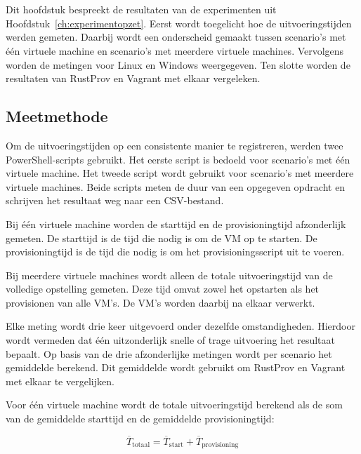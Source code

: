 \chapter{}%
\label{ch:resultaten}

Dit hoofdstuk bespreekt de resultaten van de experimenten uit
Hoofdstuk~\ref{ch:experimentopzet}. Eerst wordt toegelicht hoe de
uitvoeringstijden werden gemeten. Daarbij wordt een onderscheid gemaakt tussen
scenario's met één virtuele machine en scenario's met meerdere virtuele machines.
Vervolgens worden de metingen voor Linux en Windows weergegeven. Ten slotte
worden de resultaten van RustProv en Vagrant met elkaar vergeleken.

\section{Meetmethode}
\label{sec:meetmethode}

Om de uitvoeringstijden op een consistente manier te registreren, werden twee
PowerShell-scripts gebruikt. Het eerste script is bedoeld voor scenario's met
één virtuele machine. Het tweede script wordt gebruikt voor scenario's met
meerdere virtuele machines. Beide scripts meten de duur van een opgegeven
opdracht en schrijven het resultaat weg naar een CSV-bestand.

Bij één virtuele machine worden de starttijd en de provisioningtijd afzonderlijk
gemeten. De starttijd is de tijd die nodig is om de VM op te starten. De
provisioningtijd is de tijd die nodig is om het provisioningsscript uit te
voeren.

Bij meerdere virtuele machines wordt alleen de totale uitvoeringstijd van de
volledige opstelling gemeten. Deze tijd omvat zowel het opstarten als het
provisionen van alle VM's. De VM's worden daarbij na elkaar verwerkt.

Elke meting wordt drie keer uitgevoerd onder dezelfde omstandigheden. Hierdoor
wordt vermeden dat één uitzonderlijk snelle of trage uitvoering het resultaat
bepaalt. Op basis van de drie afzonderlijke metingen wordt per scenario het
gemiddelde berekend. Dit gemiddelde wordt gebruikt om RustProv en Vagrant met
elkaar te vergelijken.

Voor één virtuele machine wordt de totale uitvoeringstijd berekend als de som van
de gemiddelde starttijd en de gemiddelde provisioningtijd:

\[
\overline{T}_{\mathrm{totaal}} =
\overline{T}_{\mathrm{start}} +
\overline{T}_{\mathrm{provisioning}}
\]

